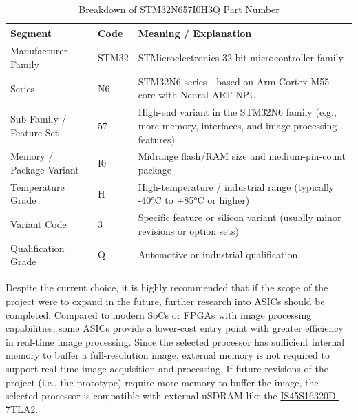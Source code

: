 \begin{table}[H]
\centering
\begin{tabular}{|l|l|p{8cm}|}
    \hline
\textbf{Segment} & \textbf{Code} & \textbf{Meaning / Explanation} \\
\hline
Manufacturer Family & STM32 & STMicroelectronics 32-bit microcontroller family \\
\hline
Series & N6 & STM32N6 series - based on Arm Cortex-M55 core with Neural ART NPU \\
\hline
Sub-Family / Feature Set & 57 & High-end variant in the STM32N6 family (e.g., more memory, interfaces, and image processing features) \\
\hline
Memory / Package Variant & I0 & Midrange flash/RAM size and medium-pin-count package \\
\hline
Temperature Grade & H & High-temperature / industrial range (typically -40°C to +85°C or higher) \\
\hline
Variant Code & 3 & Specific feature or silicon variant (usually minor revisions or option sets) \\
\hline
Qualification Grade & Q & Automotive or industrial qualification \\
\hline
\end{tabular}
\caption{Breakdown of STM32N657I0H3Q Part Number}
\label{tab:stm32n6-partnumber-n657i0}
\end{table}

Despite the current choice, it is highly recommended that if the scope of the project were to expand in the future, further research into ASICs should be completed.
Compared to modern SoCs or FPGAs with image processing capabilities, some ASICs provide a lower-cost entry point with greater efficiency in real-time image processing.
\nl
Since the selected processor has sufficient internal memory to buffer a full-resolution image, external memory is not required to support real-time image acquisition and processing.
If future revisions of the project (i.e., the prototype) require more memory to buffer the image, the selected processor is compatible with external uSDRAM like the \href{https://au.mouser.com/ProductDetail/ISSI/IS45S16320D-7TLA2?qs=Iq7RKQRjpgqlMjstEZ4V8g%3D%3D}{IS45S16320D-7TLA2}.
